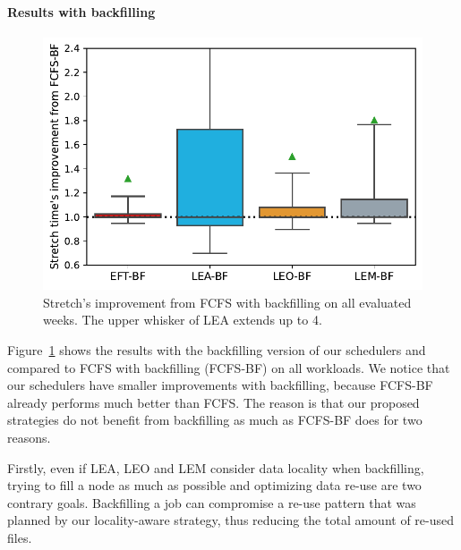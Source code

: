 \documentclass[conference]{IEEEtran}
\newcommand{\us}{\ensuremath{\mathit{user~session}}\xspace}
\begin{document}
\paragraph{Results with backfilling}
\begin{figure}[t]\centering\includegraphics[width=0.9\linewidth]{../MBSS/plot/Boxplot/byuser/box_plot_bf_stretch_all-all_1.pdf}\caption{Stretch's improvement from FCFS with backfilling on all evaluated weeks. The upper whisker of LEA extends up to 4.}\label{boxplot.all_bf}\end{figure}

Figure~\ref{boxplot.all_bf} shows the results with the backfilling version of our
schedulers and compared to FCFS with backfilling (FCFS-BF) on all workloads.
We notice that our schedulers have smaller improvements with
backfilling, because FCFS-BF already performs much better than FCFS.
The reason is that our proposed strategies do not benefit from backfilling as much as FCFS-BF does for two reasons.

Firstly, even if LEA, LEO and LEM consider data locality when backfilling, trying to fill a node as much as possible and optimizing data re-use are two contrary goals. 
Backfilling a job can compromise a re-use pattern that was planned by our locality-aware strategy,
thus reducing the total amount of re-used files.
\end{document}
